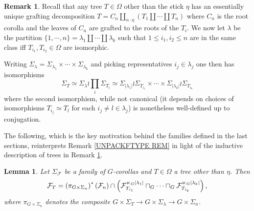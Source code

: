 \documentclass[a4paper,10pt
,draft
]{article}%
\numberwithin{equation}{section}
\numberwithin{figure}{section}
\newtheorem{lemma}[equation]{Lemma}%
\theoremstyle{definition} %
\newtheorem{remark}[equation]{Remark}%
\newcommand{\1}{\ensuremath{\mathbbm 1}}%
\begin{document}
\begin{remark}\label{TREEINDUCDESC REM}
Recall that any tree $T \in \Omega$ other than the stick $\eta$ has an essentially unique grafting decomposition
$T= C_n \amalg_{n \cdot \eta}(T_1 \amalg \cdots \amalg T_n)$ where $C_n$ is the root corolla and the leaves of $C_n$ are grafted to the roots of the $T_i$. We now let 
$\lambda$ be the partition 
$\{1,\cdots,n\} = \lambda_1 \amalg\cdots \amalg \lambda_k$
 such that $1 \leq i_1, i_2 \leq n$ are in the same class iff
 $T_{i_1}, T_{i_2} \in \Omega$ are isomorphic.
 
 Writing 
 $\Sigma_{\lambda} = \Sigma_{\lambda_1} \times \cdots \times
 \Sigma_{\lambda_k}$
and picking representatives $i_j \in \lambda_j$ 
one then has isomorphisms
\[
	\Sigma_T \simeq \Sigma_{\lambda} \wr \prod_{i} \Sigma_{T_i}
		\simeq
	\Sigma_{|\lambda_1|} \wr \Sigma_{T_{i_1}}
		\times \cdots \times	
	\Sigma_{|\lambda_k|} \wr \Sigma_{T_{i_k}}
\]
where the second isomorphism, while not canonical 
(it depends on choices of isomorphisms $T_{i_j} \simeq T_l$ for each $i_j \neq l \in \lambda_j$) is nonetheless well-defined up to conjugation.
\end{remark}

The following, which is the key motivation behind the families defined in the last sections,
reinterprets 
Remark \ref{UNPACKFTYPE REM}
in light of the inductive description of trees in
Remark \ref{TREEINDUCDESC REM}.


\begin{lemma}\label{KEYLEMMAGECO LEM}
Let $\Sigma_\mathcal{F}$ be a family of $G$-corollas and 
$T \in \Omega$ a tree other than $\eta$. Then
\begin{equation}\label{KEYLEMMAGECO EQ}
	\mathcal{F}_T =
	\left(\pi_{G \times \Sigma_n}\right)^{\**}(\mathcal{F}_n)
		\cap
	\left(
	\mathcal{F}_{T_{i_1}}^{\ltimes_G |\lambda_1|}
		\sqcap_G \cdots \sqcap_G
	\mathcal{F}_{T_{i_k}}^{\ltimes_G |\lambda_k|}
	\right),
\end{equation}
where $\pi_{G \times \Sigma_n}$ denotes the composite
$G \times \Sigma_T \to G \times \Sigma_{\lambda} \to
 G \times \Sigma_n$.
\end{lemma}
\end{document}
